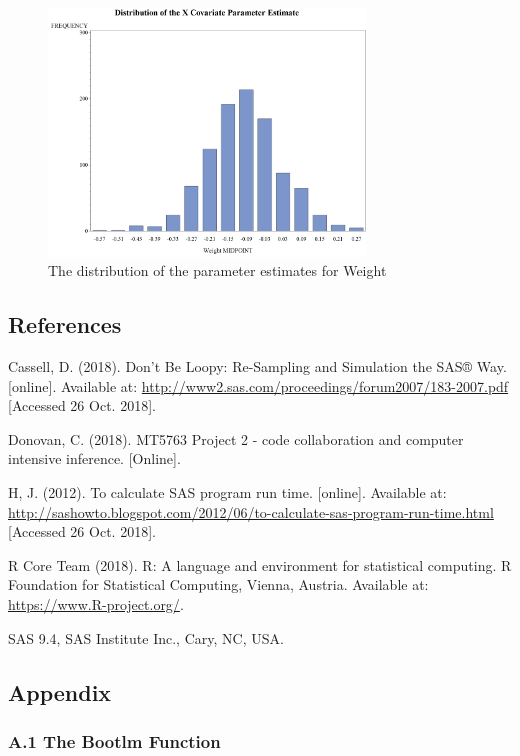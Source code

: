 \documentclass[]{article}
\begin{document}
\begin{figure}
\centering
\includegraphics[width=0.75000\textwidth]{SAS Figures/SAS weight distribution.png}
\caption{The distribution of the parameter estimates for Weight}
\end{figure}

\pagebreak 

\subsection{References}\label{references}

Cassell, D. (2018). Don't Be Loopy: Re-Sampling and Simulation the SAS®
Way. {[}online{]}. Available at:
\url{http://www2.sas.com/proceedings/forum2007/183-2007.pdf} {[}Accessed
26 Oct. 2018{]}.

Donovan, C. (2018). MT5763 Project 2 - code collaboration and computer
intensive inference. {[}Online{]}.

H, J. (2012). To calculate SAS program run time. {[}online{]}. Available
at:
\url{http://sashowto.blogspot.com/2012/06/to-calculate-sas-program-run-time.html}
{[}Accessed 26 Oct. 2018{]}.

R Core Team (2018). R: A language and environment for statistical
computing. R Foundation for Statistical Computing, Vienna, Austria.
Available at: \url{https://www.R-project.org/}.

SAS 9.4, SAS Institute Inc., Cary, NC, USA.

\pagebreak 

\subsection{Appendix}\label{appendix}

\subsubsection{A.1 The Bootlm Function}\label{a.1-the-bootlm-function}
\end{document}
